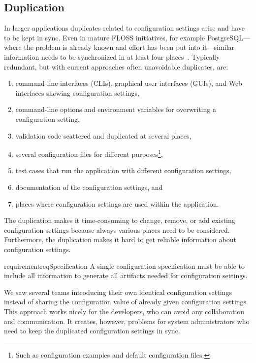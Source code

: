 \subsection{Duplication}

In larger applications duplicates related to configuration settings arise and have to be kept in sync.
Even in mature FLOSS initiatives, for example PostgreSQL---where the problem is already known and effort has been put into it---similar information needs to be synchronized in at least four places~\cite{online2016postgresql}.
Typically redundant, but with current approaches often unavoidable duplicates, are:

\begin{enumerate}
\item command-line interfaces (CLIs),
      graphical user interfaces (GUIs), and
      Web interfaces showing configuration settings,
\item command-line options and
      environment variables for overwriting a configuration setting,
\item validation code scattered and duplicated at several places,
\item several configuration files for different purposes\footnote{Such as configuration examples and default configuration files.},
\item test cases that run the application with different configuration settings,
\item documentation of the configuration settings, and
\item places where configuration settings are used within the application.
\end{enumerate}

The duplication makes it time-consuming to change, remove, or add existing configuration settings because always various places need to be considered.
Furthermore, the duplication makes it hard to get reliable information about configuration settings.

\begin{restatable}{requirement}{reqSpecification}
A single configuration specification must be able to include all information to generate all artifacts needed for configuration settings.
\end{restatable}

We saw several teams introducing their own identical configuration settings instead of sharing the configuration value of already given configuration settings.
This approach works nicely for the developers, who can avoid any collaboration and communication.
It creates, however, problems for system administrators who need to keep the duplicated configuration settings in sync.

